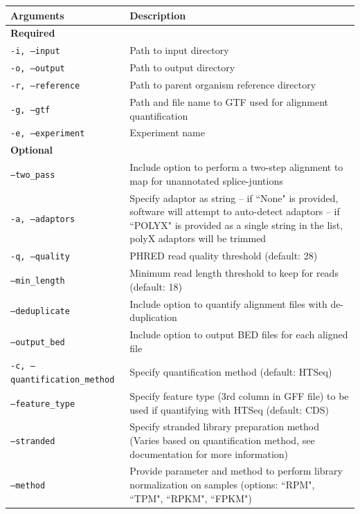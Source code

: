 \documentclass[11pt, a4paper, oneside]{article}
\begin{document}
\begin{tabular}{p{5cm}p{13cm}}
 \textbf{Arguments} & \textbf{Description} \\
 \hline
 \textbf{Required} & \\
 \hline
 \texttt{-i, --input} & Path to input directory \\
 \hline
 \texttt{-o, --output} & Path to output directory \\
 \hline
 \texttt{-r, --reference} & Path to parent organism reference directory \\
 \hline
 \texttt{-g, --gtf} & Path and file name to GTF used for alignment quantification \\
 \hline
 \texttt{-e, --experiment} & Experiment name \\
 \hline
 \textbf{Optional} & \\
 \hline
 \texttt{--two\_pass} & Include option to perform a two-step alignment to map for unannotated splice-juntions \\
 \hline
 \texttt{-a, --adaptors} & Specify adaptor as string -- if ``None" is provided, software will attempt to auto-detect adaptors -- if ``POLYX" is provided as a single string in the list, polyX adaptors will be trimmed \\
 \hline
 \texttt{-q, --quality} & PHRED read quality threshold (default: 28) \\
 \hline
 \texttt{--min\_length} & Minimum read length threshold to keep for reads (default: 18) \\
 \hline
 \texttt{--deduplicate} & Include option to quantify alignment files with de-duplication \\
 \hline
 \texttt{--output\_bed} & Include option to output BED files for each aligned file \\
 \hline
 \texttt{-c, --quantification\_method} & Specify quantification method (default: HTSeq\cite{htseq}) \\
 \hline
 \texttt{--feature\_type} & Specify feature type (3rd column in GFF file) to be used if quantifying with HTSeq (default: CDS) \\
 \hline
 \texttt{--stranded} & Specify stranded library preparation method (Varies based on quantification method, see documentation for more information) \\
 \hline
 \texttt{--method} & Provide parameter and method to perform library normalization on samples (options: ``RPM", ``TPM", ``RPKM", ``FPKM") \\

\end{tabular}
\end{document}
